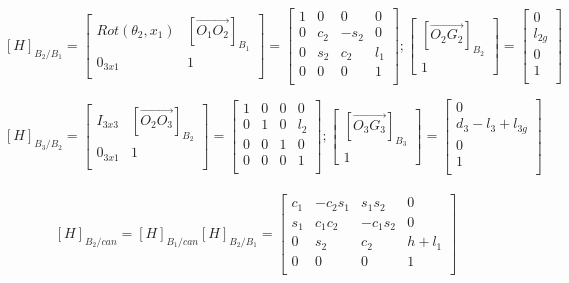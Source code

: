 \documentclass[12pt,a4paper]{article}
\begin{document}
\begin{itemize}
\begin{itemize}
$$ [H]_{B_2/B_1} =
\begin{bmatrix}
 Rot(\theta_2, x_1) & [\overrightarrow{O_1 O_2}]_{B_1} \\
 0_{3x1} & 1 \\
\end{bmatrix}
=
\begin{bmatrix}
 1 & 0 & 0 & 0 \\
 0 & c_2 & -s_2 & 0 \\
 0 & s_2 & c_2 & l_1 \\
 0 & 0 & 0 & 1 \\
\end{bmatrix} ;
\begin{bmatrix}
[\overrightarrow{O_2 G_2}]_{B_2} \\
1
\end{bmatrix}
=
\begin{bmatrix}
0 \\
l_{2g} \\
0 \\
1 \\
\end{bmatrix}
$$

$$ [H]_{B_3/B_2} =
\begin{bmatrix}
 I_{3x3} & [\overrightarrow{O_2 O_3}]_{B_2} \\
 0_{3x1} & 1 \\
\end{bmatrix}
=
\begin{bmatrix}
 1 & 0 & 0 & 0 \\
 0 & 1 & 0 & l_2 \\
 0 & 0 & 1 & 0 \\
 0 & 0 & 0 & 1 \\
\end{bmatrix} ;
\begin{bmatrix}
[\overrightarrow{O_3 G_3}]_{B_3} \\
1
\end{bmatrix}
=
\begin{bmatrix}
0 \\
d_3-l_3+l_{3g} \\
0 \\
1 \\
\end{bmatrix}
$$ \\

$$
[H]_{B_2/can} = [H]_{B_1/can} [H]_{B_2/B_1} =
 \begin{bmatrix}
 c_1 & -c_2 s_1 & s_1 s_2 & 0 \\
 s_1 & c_1 c_2 & -c_1 s_2 & 0 \\
 0 & s_2 & c_2 & h+l_1 \\
 0 & 0 & 0 & 1 \\
\end{bmatrix}
$$


\end{itemize}
\end{itemize}
\end{document}
